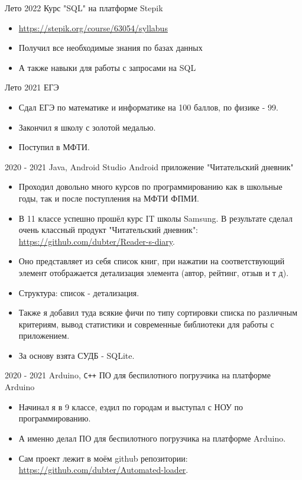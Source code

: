 \experience
{Лето 2022}
{}
{Курс "SQL" на платформе Stepik}
{\begin{itemize}
    \item \url{https://stepik.org/course/63054/syllabus
}
    \item Получил все необходимые знания по базах данных
    \item А также навыки для работы с запросами на SQL
\end{itemize}}

\experience
{Лето 2021}
{}
{ЕГЭ}
{\begin{itemize}
    \item Сдал ЕГЭ по математике и информатике на 100 баллов, по физике - 99.
    \item Закончил я школу с золотой медалью.
    \item Поступил в МФТИ.
\end{itemize}}

\experience
{2020 - 2021}
{Java, Android Studio}
{Android приложение "Читательский дневник"}
{\begin{itemize}
    \item Проходил довольно много курсов по программированию как в школьные годы, так и после поступления на МФТИ ФПМИ.
    \item В 11 классе успешно прошёл курс IT школы Samsung. В результате сделал очень классный продукт "Читательский дневник": \url{https://github.com/dubter/Reader-s-diary}.
    \item Оно представляет из себя список книг, при нажатии на соответствующий элемент отображается детализация элемента (автор, рейтинг, отзыв и т д).
    \item Структура: список - детализация. 
    \item Также я добавил туда всякие фичи по типу сортировки списка по различным критериям, вывод статистики и современные библиотеки для работы с приложением.
    \item За основу взята СУДБ - SQLite. 
\end{itemize}}

\experience
{2020 - 2021}
{Arduino, \texttt{C++}}
{ПО для беспилотного погрузчика на платформе Arduino}
{\begin{itemize}
    \item Начинал я в 9 классе, ездил по городам и выступал с НОУ по программированию. 
    \item А именно делал ПО для беспилотного погрузчика на платформе Arduino.
    \item Сам проект лежит в моём github репозитории: \url{https://github.com/dubter/Automated-loader}.
\end{itemize}}

